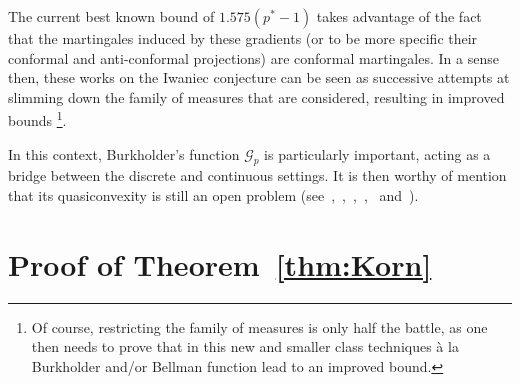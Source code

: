\documentclass[11pt, a4paper]{amsart}
\theoremstyle{definition}
\theoremstyle{remark}
\begin{document}
The current best known bound of $1.575(p^*-1)$
takes advantage of the fact 
that the martingales induced by these gradients
(or to be more specific their
conformal and anti-conformal projections)
are conformal martingales. In a sense then, these
works on the Iwaniec conjecture
can be seen as successive attempts at slimming down
the family of measures that are considered,
resulting in improved bounds
\footnote{Of course, restricting the family
of measures is only
half the battle, as one then needs to prove that
in this new and smaller class techniques à la Burkholder
and/or Bellman function
lead to an improved bound.}.\par
In this context, Burkholder's function $\mathcal G_p$ is
particularly important, acting
as a bridge between the discrete
and continuous settings. It is 
then worthy of mention that
its quasiconvexity is still an
open problem 
(see~\cite
{Astala2023TheTheory},~\cite
{KariAstala2024},~\cite
{Iwaniec2002Nonlinear},~\cite
{AstalaIwaniecPrauseSaksman2015},~\cite
{Guerra2019} and~\cite{BaernsteinII1997}).
\section{Proof of Theorem~\ref{thm:Korn}}
\end{document}
